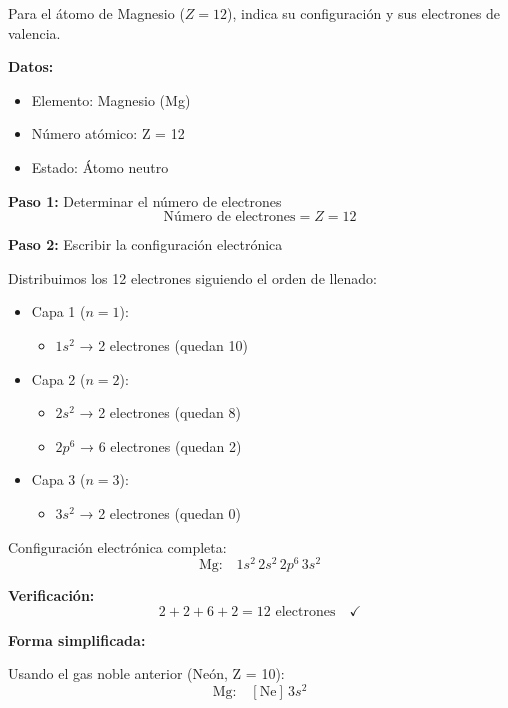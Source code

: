 \begin{exercise}
    Para el átomo de Magnesio (\( Z = 12 \)), indica su configuración y sus electrones de valencia.
    \begin{solu}
        \textbf{Datos:}
        \begin{itemize}
            \item Elemento: Magnesio (Mg)
            \item Número atómico: Z = 12
            \item Estado: Átomo neutro
        \end{itemize}

        \textbf{Paso 1:} Determinar el número de electrones
        \[
            \text{Número de electrones} = Z = 12
        \]

        \textbf{Paso 2:} Escribir la configuración electrónica

        Distribuimos los 12 electrones siguiendo el orden de llenado:
        \begin{itemize}
            \item Capa 1 (\(n = 1\)):
            \begin{itemize}
                \item \(1s^2\) → 2 electrones (quedan 10)
            \end{itemize}
            \item Capa 2 (\(n = 2\)):
            \begin{itemize}
                \item \(2s^2\) → 2 electrones (quedan 8)
                \item \(2p^6\) → 6 electrones (quedan 2)
            \end{itemize}
            \item Capa 3 (\(n = 3\)):
            \begin{itemize}
                \item \(3s^2\) → 2 electrones (quedan 0)
            \end{itemize}
        \end{itemize}

        Configuración electrónica completa:
        \[
            \text{Mg:} \quad 1s^2 \, 2s^2 \, 2p^6 \, 3s^2
        \]

        \textbf{Verificación:}
        \[
            2 + 2 + 6 + 2 = 12 \text{ electrones} \quad \checkmark
        \]

        \textbf{Forma simplificada:}

        Usando el gas noble anterior (Neón, Z = 10):
        \[
            \text{Mg:} \quad [\text{Ne}] \, 3s^2
        \]


\end{solu}
\end{exercise}
